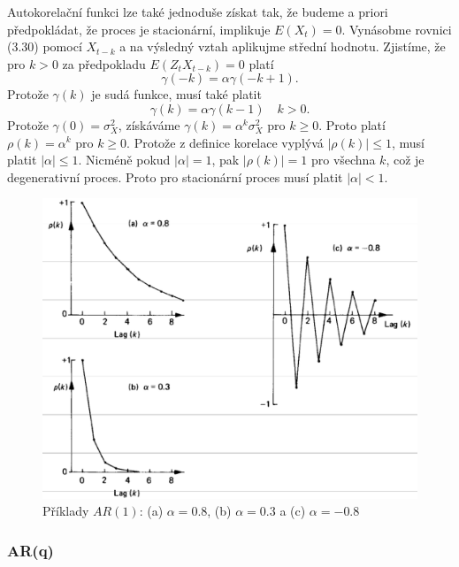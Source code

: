 Autokorelační funkci lze také jednoduše získat tak, že budeme a priori předpokládat, že proces je stacionární, implikuje $E(X_t) = 0$. Vynásobme rovnici (3.30) pomocí $X_{t - k}$ a na výsledný vztah aplikujme střední hodnotu. Zjistíme, že pro $k > 0$ za předpokladu $E(Z_t X_{t - k}) = 0$ platí
\begin{equation}
\gamma(-k) = \alpha \gamma(-k + 1).
\end{equation}
Protože $\gamma(k)$ je sudá funkce, musí také platit
\begin{equation}
\gamma(k) = \alpha \gamma(k - 1) \quad k > 0.
\end{equation}
Protože $\gamma(0) = \sigma_X^2$, získáváme $\gamma(k) = \alpha^k \sigma_X^2$ pro $k \ge 0$. Proto platí $\rho(k) = \alpha^k$ pro $k \ge 0$. Protože z definice korelace vyplývá $|\rho(k)| \le 1$, musí platit $|\alpha| \le 1$. Nicméně pokud $|\alpha| = 1$, pak $|\rho(k)| = 1$ pro všechna $k$, což je degenerativní proces. Proto pro stacionární proces musí platit $|\alpha| < 1$.

\begin{figure}[htp]
\centering
\includegraphics[scale = 0.40]{pictures/figure_3_1.eps}
\caption{Příklady $AR(1)$: (a) $\alpha = 0.8$, (b) $\alpha = 0.3$ a (c) $\alpha = -0.8$}
\label{figure_3_1}
\end{figure}

\subsubsection{AR(q)}

